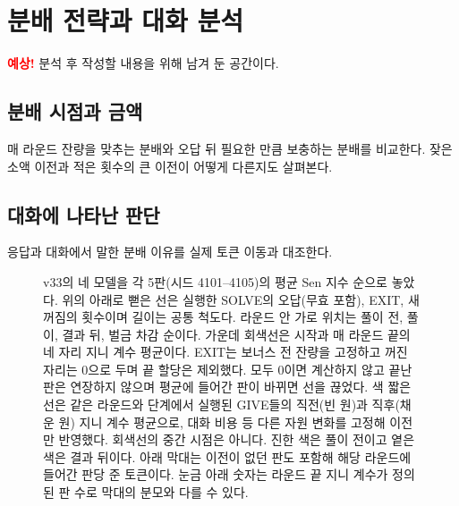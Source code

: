 \section{분배 전략과 대화 분석}\label{sec:strategies}

\noindent\textcolor{red}{\textbf{예상!}} 분석 후 작성할 내용을 위해 남겨 둔 공간이다.

\subsection{분배 시점과 금액}

매 라운드 잔량을 맞추는 분배와 오답 뒤 필요한 만큼 보충하는 분배를 비교한다.
잦은 소액 이전과 적은 횟수의 큰 이전이 어떻게 다른지도 살펴본다.

\subsection{대화에 나타난 판단}

응답과 대화에서 말한 분배 이유를 실제 토큰 이동과 대조한다.

\begin{figure}[t]
\centering
\resizebox{\textwidth}{!}{}
\caption{v33의 네 모델을 각 5판(시드 4101--4105)의 평균 Sen 지수 순으로 놓았다. 위의 아래로 뻗은 선은 실행한 SOLVE의 오답(무효 포함), EXIT, 새 꺼짐의 횟수이며 길이는 공통 척도다. 라운드 안 가로 위치는 풀이 전, 풀이, 결과 뒤, 벌금 차감 순이다. 가운데 회색선은 시작과 매 라운드 끝의 네 자리 지니 계수 평균이다. EXIT는 보너스 전 잔량을 고정하고 꺼진 자리는 0으로 두며 끝 할당은 제외했다. 모두 0이면 계산하지 않고 끝난 판은 연장하지 않으며 평균에 들어간 판이 바뀌면 선을 끊었다. 색 짧은 선은 같은 라운드와 단계에서 실행된 GIVE들의 직전(빈 원)과 직후(채운 원) 지니 계수 평균으로, 대화 비용 등 다른 자원 변화를 고정해 이전만 반영했다. 회색선의 중간 시점은 아니다. 진한 색은 풀이 전이고 옅은 색은 결과 뒤이다. 아래 막대는 이전이 없던 판도 포함해 해당 라운드에 들어간 판당 준 토큰이다. 눈금 아래 숫자는 라운드 끝 지니 계수가 정의된 판 수로 막대의 분모와 다를 수 있다.}
\label{fig:arena-gini}
\end{figure}
